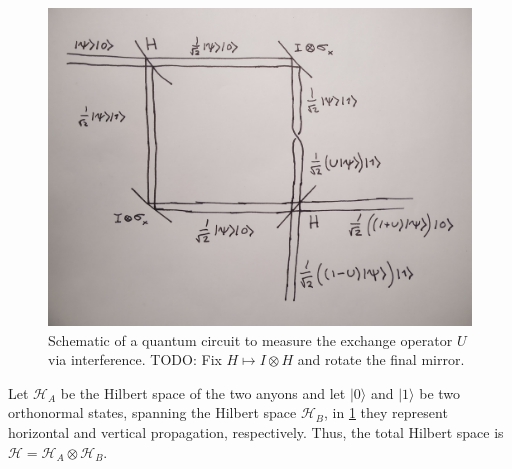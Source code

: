 \documentclass[a4paper,10pt,oneside]{book}
\theoremstyle{plain}
\theoremstyle{definition}
\theoremstyle{remark}
\begin{document}
\begin{figure}
  \centering
  \includegraphics[width=\textwidth]{img/exchange-interference.jpg}
  \caption{Schematic of a quantum circuit to measure the exchange operator $U$ via interference. TODO: Fix $H ↦ I⊗H$ and rotate the final mirror.}
  \label{fig:exchange interference}
\end{figure}

Let $\mathcal{H}_A$ be the Hilbert space of the two anyons and let $|0⟩$ and $|1⟩$ be two orthonormal states, spanning the Hilbert space $\mathcal{H}_B$, in \cref{fig:exchange interference} they represent horizontal and vertical propagation, respectively. Thus, the total Hilbert space is $\mathcal{H} = \mathcal{H}_A⊗\mathcal{H}_B$.
\end{document}
